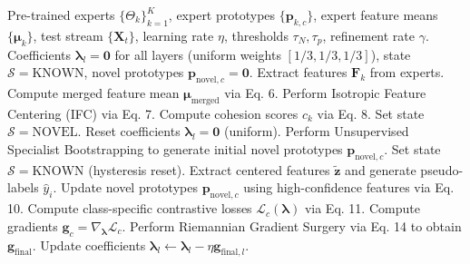 \documentclass{article}
\theoremstyle{plain}
\theoremstyle{definition}
\theoremstyle{remark}
\begin{document}
\begin{algorithm}[tb]
\caption{IGGS-PROTO Online Adaptation Loop}
\label{alg:iggs_proto}
\begin{algorithmic}[1]
 Pre-trained experts $\{\Theta_k\}_{k=1}^K$, expert prototypes $\{\mathbf{p}_{k, c}\}$, expert feature means $\{\boldsymbol{\mu}_k\}$, test stream $\{\mathbf{X}_t\}$, learning rate $\eta$, thresholds $\tau_N, \tau_p$, refinement rate $\gamma$.
 Coefficients $\boldsymbol{\lambda}_l = \mathbf{0}$ for all layers (uniform weights $[1/3, 1/3, 1/3]$), state $\mathcal{S} = \text{KNOWN}$, novel prototypes $\mathbf{p}_{\text{novel}, c} = \mathbf{0}$.
    \STATE Extract features $\mathbf{F}_{k}$ from experts.
    \STATE Compute merged feature mean $\boldsymbol{\mu}_{\text{merged}}$ via Eq. 6.
    \STATE Perform Isotropic Feature Centering (IFC) via Eq. 7.
    \STATE Compute cohesion scores $c_k$ via Eq. 8.
        \STATE Set state $\mathcal{S} = \text{NOVEL}$.
        \STATE Reset coefficients $\boldsymbol{\lambda}_l = \mathbf{0}$ (uniform).
        \STATE Perform Unsupervised Specialist Bootstrapping to generate initial novel prototypes $\mathbf{p}_{\text{novel}, c}$.
        \STATE Set state $\mathcal{S} = \text{KNOWN}$ (hysteresis reset).
    \ENDIF
        \STATE Extract centered features $\tilde{\mathbf{z}}$ and generate pseudo-labels $\hat{y}_i$.
        \STATE Update novel prototypes $\mathbf{p}_{\text{novel}, c}$ using high-confidence features via Eq. 10.
        \STATE Compute class-specific contrastive losses $\mathcal{L}_c(\boldsymbol{\lambda})$ via Eq. 11.
        \STATE Compute gradients $\mathbf{g}_c = \nabla_{\boldsymbol{\lambda}} \mathcal{L}_c$.
        \STATE Perform Riemannian Gradient Surgery via Eq. 14 to obtain $\mathbf{g}_{\text{final}}$.
        \STATE Update coefficients $\boldsymbol{\lambda}_l \leftarrow \boldsymbol{\lambda}_l - \eta \mathbf{g}_{\text{final}, l}$.
    \ENDIF
\ENDFOR
\end{algorithmic}
\end{algorithm}
\end{document}
